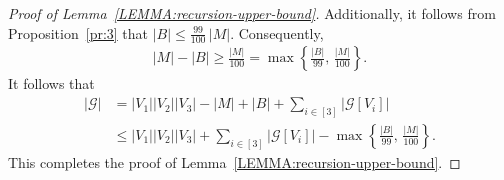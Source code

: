 \documentclass[11pt,a4paper]{article}
\theoremstyle{remark}
\begin{document}
\begin{proof}[Proof of Lemma~\ref{LEMMA:recursion-upper-bound}]
Additionally, it follows from Proposition~\ref{pr:3} that $|B| \le \frac{99}{100}\, |M|$. 
Consequently,  
    \begin{align}\label{equ:bad-vs-missing}
        |M| - |B|
        \ge \frac{|M|}{100}=\max\left\{\frac{|B|}{99},\,\frac{|M|}{100}\right\}. 
    \end{align}
%
It follows that 
\begin{align*}%
    |\mathcal{G}|
    & = |V_1||V_2||V_3| - |M| + |B|  + \sum_{i\in [3]}|\mathcal{G}[V_i]|  \\
    & \le |V_1||V_2||V_3| + \sum_{i\in [3]}|\mathcal{G}[V_i]| - \max\left\{\frac{|B|}{99},\,\frac{|M|}{100}\right\}.
\end{align*}
%
This completes the proof of Lemma~\ref{LEMMA:recursion-upper-bound}. 
\end{proof}
\end{document}
